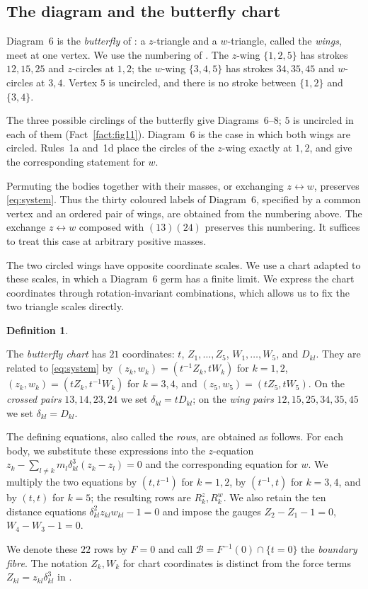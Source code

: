 \documentclass[Threeside,11pt]{article}
\theoremstyle{definition}
\newtheorem{definition}[theorem]{Definition}
\theoremstyle{remark}
\numberwithin{equation}{section}
\theoremstyle{remark}
\begin{document}
\subsection{The diagram and the butterfly chart}

{
Diagram~6 is the \emph{butterfly} of \cite[\S7.4]{AK}: a $z$-triangle and a
$w$-triangle, called the \emph{wings}, meet at one vertex.  We use the numbering
of \cite[\S8.6]{AK}.  The $z$-wing $\{1,2,5\}$ has strokes $12,15,25$ and
$z$-circles at $1,2$; the $w$-wing $\{3,4,5\}$ has strokes $34,35,45$ and
$w$-circles at $3,4$.  Vertex $5$ is uncircled, and there is no stroke between
$\{1,2\}$ and $\{3,4\}$.

The three possible circlings of the butterfly give Diagrams~6--8;
$5$ is uncircled in each of them \cite[\S7.4]{AK} (Fact~\ref{fact:fig11}).
Diagram~6 is the case in which both wings are circled.  Rules~1a and~1d place
the circles of the $z$-wing exactly at $1,2$, and give the corresponding
statement for $w$.
}

{
Permuting the bodies together with their masses, or exchanging
$z\leftrightarrow w$, preserves \eqref{eq:system}.  Thus the thirty coloured
labels of Diagram~6, specified by a common vertex and an ordered pair of
wings, are obtained from the numbering above.  The exchange
$z\leftrightarrow w$ composed with $(13)(24)$ preserves this numbering.
It suffices to treat this case at arbitrary positive masses.

The two circled wings have opposite coordinate scales.  We use a chart
adapted to these scales, in which a Diagram~6 germ has a finite limit.
We express the chart coordinates through rotation-invariant combinations,
which allows us to fix the two triangle scales directly.
}

\begin{definition}\label{d6-def-chart}
{
The \emph{butterfly chart} has $21$ coordinates: $t$, $Z_1,\dots,Z_5$,
$W_1,\dots,W_5$, and $D_{kl}$.  They are related to \eqref{eq:system} by
$(z_k,w_k)=(t^{-1}Z_k,tW_k)$ for $k=1,2$,
$(z_k,w_k)=(tZ_k,t^{-1}W_k)$ for $k=3,4$, and
$(z_5,w_5)=(tZ_5,tW_5)$.  On the \emph{crossed pairs} $13,14,23,24$ we set
$\delta_{kl}=tD_{kl}$; on the \emph{wing pairs} $12,15,25,34,35,45$ we set
$\delta_{kl}=D_{kl}$.

The defining equations, also called the \emph{rows}, are obtained as follows.
For each body, we substitute these expressions into the $z$-equation
$z_k-\sum_{l\ne k}m_l\delta_{kl}^3(z_k-z_l)=0$ and the corresponding equation
for $w$.  We multiply the two equations by $(t,t^{-1})$ for $k=1,2$,
by $(t^{-1},t)$ for $k=3,4$, and by $(t,t)$ for $k=5$; the resulting rows are
$R^z_k,R^w_k$.  We also retain the ten distance equations
$\delta_{kl}^2z_{kl}w_{kl}-1=0$ and impose the gauges
$Z_2-Z_1-1=0$, $W_4-W_3-1=0$.

We denote these $22$ rows by $F=0$ and call
$\mathcal B=F^{-1}(0)\cap\{t=0\}$ the \emph{boundary fibre}.
The notation $Z_k,W_k$ for chart coordinates is distinct from the force
terms $Z_{kl}=z_{kl}\delta_{kl}^3$ in \cite[\S3]{AK}.
}
\end{definition}
\end{document}
